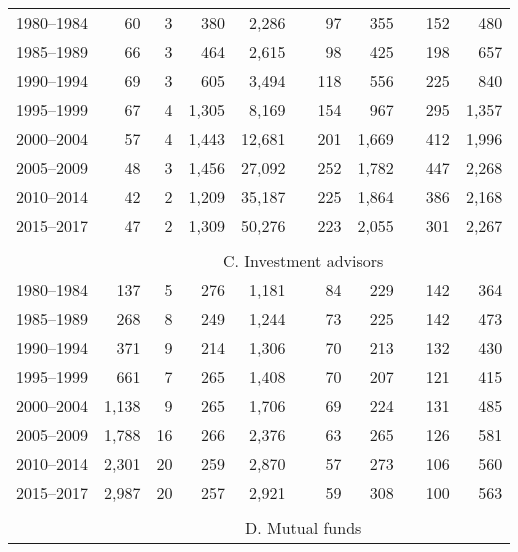 \documentclass{article}
\begin{document}
\begin{table}[h]
{\begin{tabular}{rrrrrrrrrrr}
            1980–1984 & 60 & 3 & 380 & 2,286 & & 97 & 355 & & 152 & 480 \\
            1985–1989 & 66 & 3 & 464 & 2,615 & & 98 & 425 & & 198 & 657 \\
            1990–1994 & 69 & 3 & 605 & 3,494 & & 118 & 556 & & 225 & 840 \\
            1995–1999 & 67 & 4 & 1,305 & 8,169 & & 154 & 967 & & 295 & 1,357 \\
            2000–2004 & 57 & 4 & 1,443 & 12,681 & & 201 & 1,669 & & 412 & 1,996 \\
            2005–2009 & 48 & 3 & 1,456 & 27,092 & & 252 & 1,782 & & 447 & 2,268 \\
            2010–2014 & 42 & 2 & 1,209 & 35,187 & & 225 & 1,864 & & 386 & 2,168 \\
            2015–2017 & 47 & 2 & 1,309 & 50,276 & & 223 & 2,055 & & 301 & 2,267 \\
    
            \cline{2-11}
            \\[-2.5ex]
            & \multicolumn{10}{c}{C. Investment advisors} \\ \cline{2-11}
            
            1980–1984 & 137 & 5 & 276 & 1,181 & & 84 & 229 & & 142 & 364 \\
            1985–1989 & 268 & 8 & 249 & 1,244 & & 73 & 225 & & 142 & 473 \\
            1990–1994 & 371 & 9 & 214 & 1,306 & & 70 & 213 & & 132 & 430 \\
            1995–1999 & 661 & 7 & 265 & 1,408 & & 70 & 207 & & 121 & 415 \\
            2000–2004 & 1,138 & 9 & 265 & 1,706 & & 69 & 224 & & 131 & 485 \\
            2005–2009 & 1,788 & 16 & 266 & 2,376 & & 63 & 265 & & 126 & 581 \\
            2010–2014 & 2,301 & 20 & 259 & 2,870 & & 57 & 273 & & 106 & 560 \\
            2015–2017 & 2,987 & 20 & 257 & 2,921 & & 59 & 308 & & 100 & 563 \\
            
            \cline{2-11}
            \\[-2.5ex]
            & \multicolumn{10}{c}{D. Mutual funds} \\ \cline{2-11}
            

\end{tabular}}
\end{table}
\end{document}
